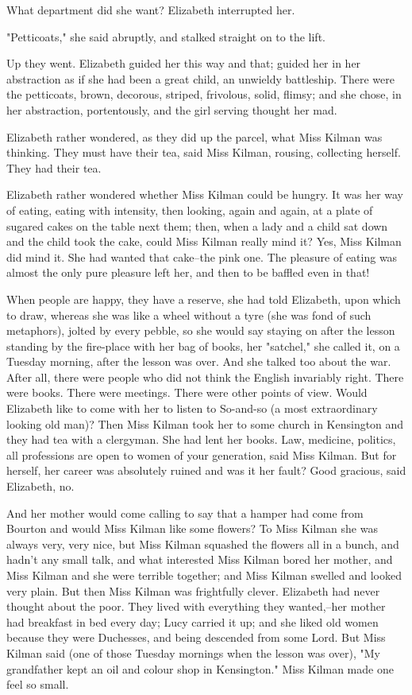 \documentclass[lang=cn,10pt]{elegantbook}
\begin{document}
What department did she want?  Elizabeth interrupted her.

"Petticoats," she said abruptly, and stalked straight on to the
lift.

Up they went.  Elizabeth guided her this way and that; guided her
in her abstraction as if she had been a great child, an unwieldy
battleship.  There were the petticoats, brown, decorous, striped,
frivolous, solid, flimsy; and she chose, in her abstraction,
portentously, and the girl serving thought her mad.

Elizabeth rather wondered, as they did up the parcel, what Miss
Kilman was thinking.  They must have their tea, said Miss Kilman,
rousing, collecting herself.  They had their tea.

Elizabeth rather wondered whether Miss Kilman could be hungry.  It
was her way of eating, eating with intensity, then looking, again
and again, at a plate of sugared cakes on the table next them;
then, when a lady and a child sat down and the child took the cake,
could Miss Kilman really mind it?  Yes, Miss Kilman did mind it.
She had wanted that cake--the pink one.  The pleasure of eating was
almost the only pure pleasure left her, and then to be baffled even
in that!

When people are happy, they have a reserve, she had told Elizabeth,
upon which to draw, whereas she was like a wheel without a tyre
(she was fond of such metaphors), jolted by every pebble, so she
would say staying on after the lesson standing by the fire-place
with her bag of books, her "satchel," she called it, on a Tuesday
morning, after the lesson was over.  And she talked too about the
war.  After all, there were people who did not think the English
invariably right.  There were books.  There were meetings.  There
were other points of view.  Would Elizabeth like to come with her
to listen to So-and-so (a most extraordinary looking old man)?
Then Miss Kilman took her to some church in Kensington and they had
tea with a clergyman.  She had lent her books.  Law, medicine,
politics, all professions are open to women of your generation,
said Miss Kilman.  But for herself, her career was absolutely
ruined and was it her fault?  Good gracious, said Elizabeth, no.

And her mother would come calling to say that a hamper had come
from Bourton and would Miss Kilman like some flowers?  To Miss
Kilman she was always very, very nice, but Miss Kilman squashed the
flowers all in a bunch, and hadn't any small talk, and what
interested Miss Kilman bored her mother, and Miss Kilman and she
were terrible together; and Miss Kilman swelled and looked very
plain.  But then Miss Kilman was frightfully clever.  Elizabeth had
never thought about the poor.  They lived with everything they
wanted,--her mother had breakfast in bed every day; Lucy carried it
up; and she liked old women because they were Duchesses, and being
descended from some Lord.  But Miss Kilman said (one of those
Tuesday mornings when the lesson was over), "My grandfather kept an
oil and colour shop in Kensington."  Miss Kilman made one feel so
small.
\end{document}
